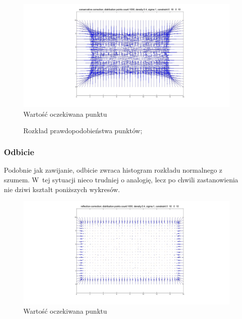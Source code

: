 \documentclass{mini}
\begin{document}
\begin{figure}[H]
\centering
\includegraphics[width=\textwidth]{wrapping2dprzesuniecie}
\caption{Wartość oczekiwana punktu}
\end{figure}

\begin{figure}[H]
\centering
{}
\quad
{}
\caption{Rozkład prawdopodobieństwa punktów;}
\end{figure}

\subsubsection*{Odbicie}
Podobnie jak zawijanie, odbicie zwraca histogram rozkładu normalnego z szumem. W~tej sytuacji nieco trudniej o analogię, lecz po chwili zastanowienia nie dziwi kształt poniższych wykresów.

\begin{figure}[H]
\centering
\includegraphics[width=\textwidth]{reflection2dprzesuniecie}
\caption{Wartość oczekiwana punktu}
\end{figure}
\end{document}
